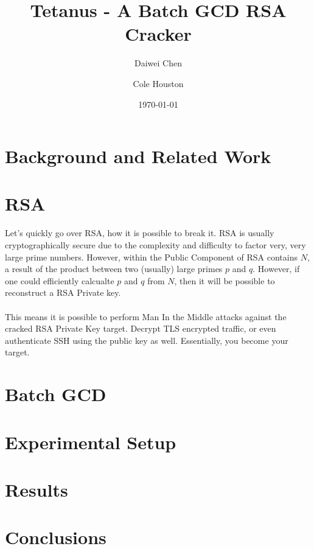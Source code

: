 \documentclass[10pt, letterpaper]{article}
\title{Tetanus - A Batch GCD RSA Cracker}
\author{Daiwei Chen \and Cole Houston}
\date{\today}
\begin{document}
\maketitle
\begin{abstract}

\end{abstract}

\section{Background and Related Work}


\section{RSA}
Let's quickly go over RSA, how it is possible to break it. RSA is usually cryptographically secure due to the complexity and difficulty to factor very, very large prime numbers. However, within the Public Component of RSA contains $N$, a result of the product between two (usually) large primes $p$ and $q$. However, if one could efficiently calcualte $p$ and $q$ from $N$, then it will be possible to reconstruct a RSA Private key. \\
\\
This means it is possible to perform Man In the Middle attacks against the cracked RSA Private Key target. Decrypt TLS encrypted traffic, or even authenticate SSH using the public key as well. Essentially, you become your target.

\section{Batch GCD}

\section{Experimental Setup}

\section{Results}

\section{Conclusions}
\end{document}

